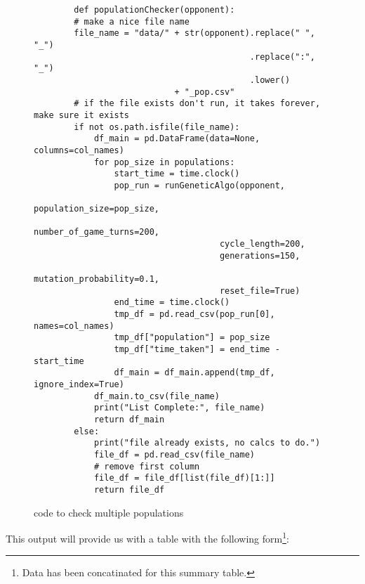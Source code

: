 \begin{figure}\label{code:populationChecker}
    \begin{verbatim}
        def populationChecker(opponent):
        # make a nice file name
        file_name = "data/" + str(opponent).replace(" ", "_")
                                           .replace(":", "_")
                                           .lower() 
                            + "_pop.csv"
        # if the file exists don't run, it takes forever, make sure it exists 
        if not os.path.isfile(file_name):
            df_main = pd.DataFrame(data=None, columns=col_names)
            for pop_size in populations:
                start_time = time.clock()
                pop_run = runGeneticAlgo(opponent,
                                     population_size=pop_size,
                                     number_of_game_turns=200,
                                     cycle_length=200,
                                     generations=150,
                                     mutation_probability=0.1,
                                     reset_file=True)
                end_time = time.clock()
                tmp_df = pd.read_csv(pop_run[0], names=col_names)
                tmp_df["population"] = pop_size
                tmp_df["time_taken"] = end_time - start_time
                df_main = df_main.append(tmp_df, ignore_index=True)
            df_main.to_csv(file_name)
            print("List Complete:", file_name)
            return df_main
        else:
            print("file already exists, no calcs to do.")
            file_df = pd.read_csv(file_name)
            # remove first column
            file_df = file_df[list(file_df)[1:]]
            return file_df
    \end{verbatim}
    \caption{code to check multiple populations}    
\end{figure}
This output will provide us with a table with the following form\footnote{Data has been concatinated for this summary table.}:

